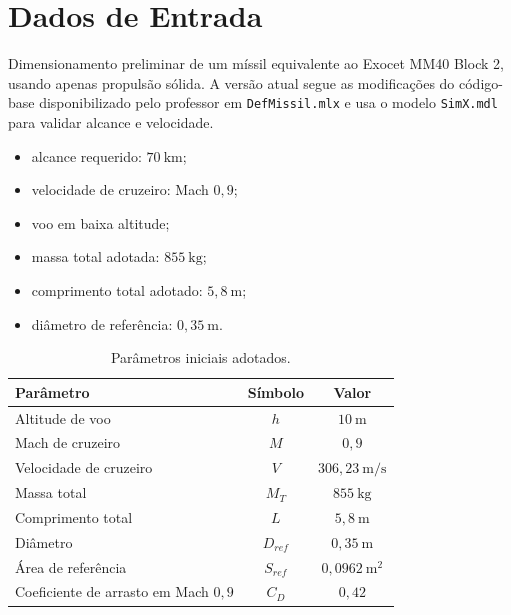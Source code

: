 ﻿\section{Dados de Entrada}

Dimensionamento preliminar de um míssil equivalente ao Exocet MM40 Block 2, usando apenas propulsão sólida. A versão atual segue as modificações do código-base disponibilizado pelo professor em \texttt{DefMissil.mlx} e usa o modelo \texttt{SimX.mdl} para validar alcance e velocidade.

\begin{itemize}
    \item alcance requerido: \(70~\text{km}\);
    \item velocidade de cruzeiro: Mach \(0{,}9\);
    \item voo em baixa altitude;
    \item massa total adotada: \(855~\text{kg}\);
    \item comprimento total adotado: \(5{,}8~\text{m}\);
    \item diâmetro de referência: \(0{,}35~\text{m}\).
\end{itemize}

\begin{table}[H]
\centering
\caption{Parâmetros iniciais adotados.}
\begin{tabular}{lcc}
\toprule
Parâmetro & Símbolo & Valor \\
\midrule
Altitude de voo & \(h\) & \(10~\text{m}\) \\
Mach de cruzeiro & \(M\) & \(0{,}9\) \\
Velocidade de cruzeiro & \(V\) & \(306{,}23~\text{m/s}\) \\
Massa total & \(M_T\) & \(855~\text{kg}\) \\
Comprimento total & \(L\) & \(5{,}8~\text{m}\) \\
Diâmetro & \(D_{ref}\) & \(0{,}35~\text{m}\) \\
Área de referência & \(S_{ref}\) & \(0{,}0962~\text{m}^2\) \\
Coeficiente de arrasto em Mach \(0{,}9\) & \(C_D\) & \(0{,}42\) \\
\bottomrule
\end{tabular}
\end{table}
